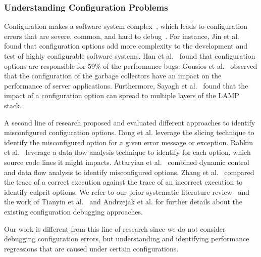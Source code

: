 \subsubsection{Understanding Configuration Problems}
Configuration makes a software system complex~\cite{tse}, which leads to configuration errors that are severe, common, and hard to debug~\cite{RN3251}. For instance, Jin et al.~\cite{RN2897} found that configuration options add more complexity to the development and test of highly configurable software systems. Han et al.~\cite{RN2864} found that configuration options are responsible for 59\% of the performance bugs. Gousios et al.~\cite{RN3551} observed that the configuration of the garbage collectors have an impact on the performance of server applications. Furthermore, Sayagh et al.~\cite{RN3249, RN2758} found that the impact of a configuration option can spread to multiple layers of the LAMP stack.%

A second line of research proposed and evaluated different approaches to identify misconfigured configuration options. Dong et al.\cite{RN2805, RN3163} leverage the slicing technique to identify the misconfigured option for a given error message or exception. Rabkin et al.~\cite{RN2822} leverage a data flow analysis technique to identify for each option, which source code lines it might impacts. Attaryian et al.~\cite{RN3248} combined dynamic control and data flow analysis to identify misconfigured options. Zhang et al.~\cite{RN2839, RN2777} compared the trace of a correct execution against the trace of an incorrect execution to identify culprit options. We refer to our prior systematic literature review~\cite{tse} and the work of Tianyin et al.~\cite{RN3252} and Andrzejak et al.\cite{andrzejaksoftware} for further details about the existing configuration debugging approaches. 

Our work is different from this line of research since we do not consider debugging configuration errors, but understanding and identifying performance regressions that are caused under certain configurations.

